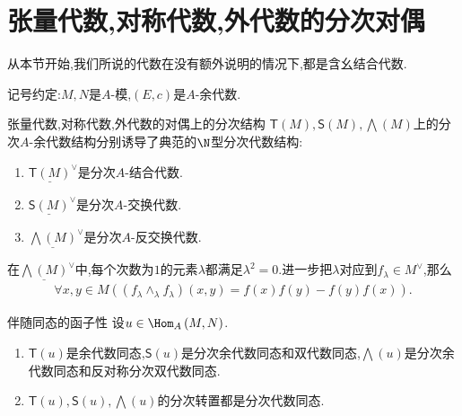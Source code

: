 \section{张量代数,对称代数,外代数的分次对偶}

从本节开始,我们所说的代数在没有额外说明的情况下,都是含幺结合代数.

记号约定:$M,N$是$A$-模,$\left(E,c\right)$是$A$-余代数.

\begin{definition}{张量代数,对称代数,外代数的对偶上的分次结构}{}
	$\mathsf{T}\left(M\right),\mathsf{S}\left(M\right),\bigwedge\left(M\right)$上的分次$A$-余代数结构分别诱导了典范的$\N$型分次代数结构:
	\begin{enumerate}
		\item $\underline{\mathsf{T}\left(M\right)}^{\vee}$是分次$A$-结合代数.
		\item $\underline{\mathsf{S}\left(M\right)}^{\vee}$是分次$A$-交换代数.
		\item $\underline{\bigwedge\left(M\right)}^{\vee}$是分次$A$-反交换代数.
	\end{enumerate}
\end{definition}

\begin{remark}{}{}
	在$\underline{\bigwedge\left(M\right)}^{\vee}$中,每个次数为$1$的元素$\lambda$都满足$\lambda^{2}=0$.进一步把$\lambda$对应到$f_{\lambda}\in M^{\vee}$,那么
	\begin{align*}
		\forall x,y\in M\left(\left(f_{\lambda}\wedge_{\lambda}f_{\lambda}\right)\left(x,y\right)=f\left(x\right)f\left(y\right)-f\left(y\right)f\left(x\right)\right).
	\end{align*}
\end{remark}

\begin{proposition}{伴随同态的函子性}{}
	设$u\in\Hom_{A}\left(M,N\right)$.
	\begin{enumerate}
		\item $\mathsf{T}\left(u\right)$是余代数同态,$\mathsf{S}\left(u\right)$是分次余代数同态和双代数同态,$\bigwedge\left(u\right)$是分次余代数同态和反对称分次双代数同态.
		\item $\mathsf{T}\left(u\right),\mathsf{S}\left(u\right),\bigwedge\left(u\right)$的分次转置都是分次代数同态.
	\end{enumerate}
\end{proposition}

